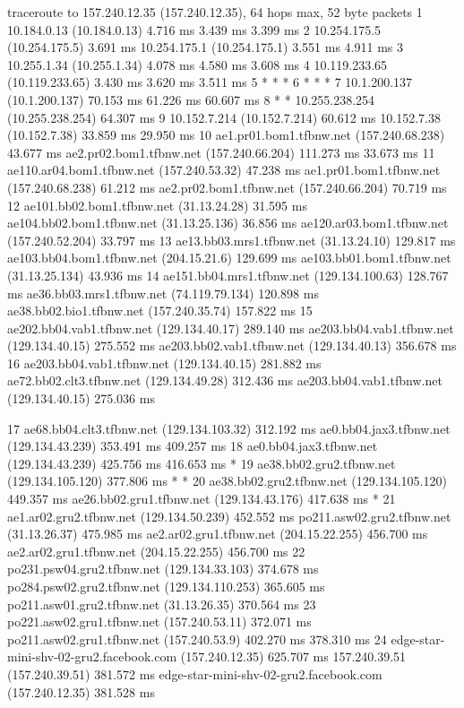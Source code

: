 \begin{code}
traceroute to 157.240.12.35 (157.240.12.35), 64 hops max, 52 byte packets
 1  10.184.0.13 (10.184.0.13)  4.716 ms  3.439 ms  3.399 ms
 2  10.254.175.5 (10.254.175.5)  3.691 ms
    10.254.175.1 (10.254.175.1)  3.551 ms  4.911 ms
 3  10.255.1.34 (10.255.1.34)  4.078 ms  4.580 ms  3.608 ms
 4  10.119.233.65 (10.119.233.65)  3.430 ms  3.620 ms  3.511 ms
 5  * * *
 6  * * *
 7  10.1.200.137 (10.1.200.137)  70.153 ms  61.226 ms  60.607 ms
 8  * * 10.255.238.254 (10.255.238.254)  64.307 ms
 9  10.152.7.214 (10.152.7.214)  60.612 ms
    10.152.7.38 (10.152.7.38)  33.859 ms  29.950 ms
10  ae1.pr01.bom1.tfbnw.net (157.240.68.238)  43.677 ms
    ae2.pr02.bom1.tfbnw.net (157.240.66.204)  111.273 ms  33.673 ms
11  ae110.ar04.bom1.tfbnw.net (157.240.53.32)  47.238 ms
    ae1.pr01.bom1.tfbnw.net (157.240.68.238)  61.212 ms
    ae2.pr02.bom1.tfbnw.net (157.240.66.204)  70.719 ms
12  ae101.bb02.bom1.tfbnw.net (31.13.24.28)  31.595 ms
    ae104.bb02.bom1.tfbnw.net (31.13.25.136)  36.856 ms
    ae120.ar03.bom1.tfbnw.net (157.240.52.204)  33.797 ms
13  ae13.bb03.mrs1.tfbnw.net (31.13.24.10)  129.817 ms
    ae103.bb04.bom1.tfbnw.net (204.15.21.6)  129.699 ms
    ae103.bb01.bom1.tfbnw.net (31.13.25.134)  43.936 ms
14  ae151.bb04.mrs1.tfbnw.net (129.134.100.63)  128.767 ms
    ae36.bb03.mrs1.tfbnw.net (74.119.79.134)  120.898 ms
    ae38.bb02.bio1.tfbnw.net (157.240.35.74)  157.822 ms
15  ae202.bb04.vab1.tfbnw.net (129.134.40.17)  289.140 ms
    ae203.bb04.vab1.tfbnw.net (129.134.40.15)  275.552 ms
    ae203.bb02.vab1.tfbnw.net (129.134.40.13)  356.678 ms
16  ae203.bb04.vab1.tfbnw.net (129.134.40.15)  281.882 ms
    ae72.bb02.clt3.tfbnw.net (129.134.49.28)  312.436 ms
    ae203.bb04.vab1.tfbnw.net (129.134.40.15)  275.036 ms
\end{code}
\begin{code}
17  ae68.bb04.clt3.tfbnw.net (129.134.103.32)  312.192 ms
    ae0.bb04.jax3.tfbnw.net (129.134.43.239)  353.491 ms  409.257 ms
18  ae0.bb04.jax3.tfbnw.net (129.134.43.239)  425.756 ms  416.653 ms *
19  ae38.bb02.gru2.tfbnw.net (129.134.105.120)  377.806 ms * *
20  ae38.bb02.gru2.tfbnw.net (129.134.105.120)  449.357 ms
    ae26.bb02.gru1.tfbnw.net (129.134.43.176)  417.638 ms *
21  ae1.ar02.gru2.tfbnw.net (129.134.50.239)  452.552 ms
    po211.asw02.gru2.tfbnw.net (31.13.26.37)  475.985 ms
    ae2.ar02.gru1.tfbnw.net (204.15.22.255)  456.700 ms
    ae2.ar02.gru1.tfbnw.net (204.15.22.255)  456.700 ms
22  po231.psw04.gru2.tfbnw.net (129.134.33.103)  374.678 ms
    po284.psw02.gru2.tfbnw.net (129.134.110.253)  365.605 ms
    po211.asw01.gru2.tfbnw.net (31.13.26.35)  370.564 ms
23  po221.asw02.gru1.tfbnw.net (157.240.53.11)  372.071 ms
    po211.asw02.gru1.tfbnw.net (157.240.53.9)  402.270 ms  378.310 ms
24  edge-star-mini-shv-02-gru2.facebook.com (157.240.12.35)  625.707 ms
    157.240.39.51 (157.240.39.51)  381.572 ms
    edge-star-mini-shv-02-gru2.facebook.com (157.240.12.35)  381.528 ms
\end{code}


